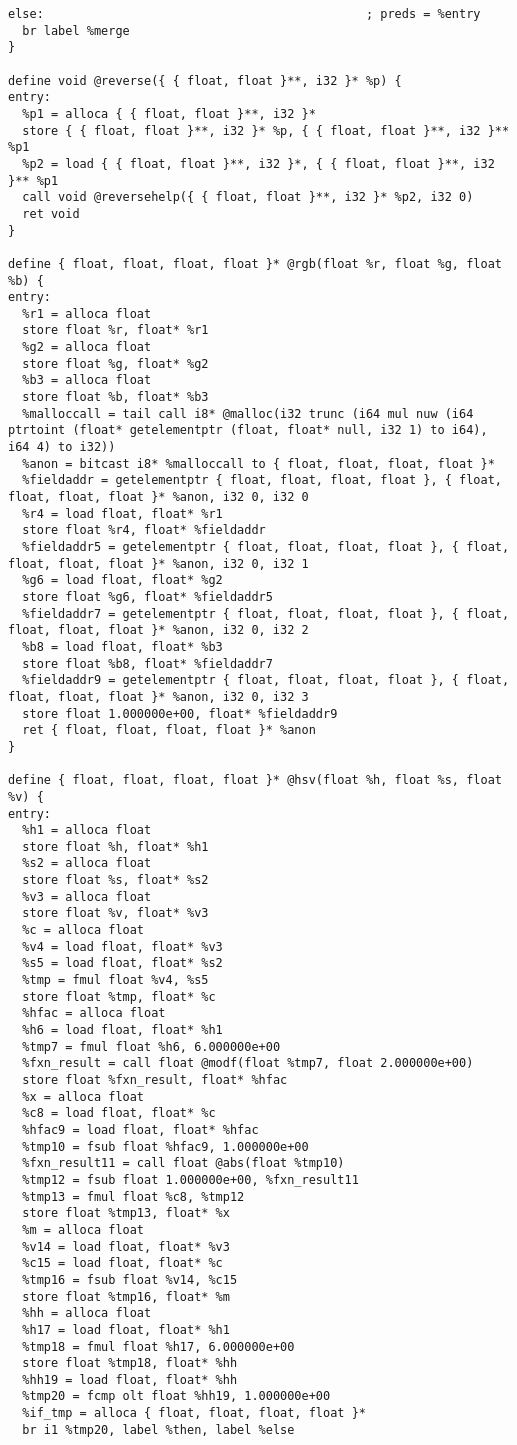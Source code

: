\documentclass[main.tex]{subfiles}
\begin{document}
{\begin{lstlisting}
else:                                             ; preds = %entry
  br label %merge
}

define void @reverse({ { float, float }**, i32 }* %p) {
entry:
  %p1 = alloca { { float, float }**, i32 }*
  store { { float, float }**, i32 }* %p, { { float, float }**, i32 }** %p1
  %p2 = load { { float, float }**, i32 }*, { { float, float }**, i32 }** %p1
  call void @reversehelp({ { float, float }**, i32 }* %p2, i32 0)
  ret void
}

define { float, float, float, float }* @rgb(float %r, float %g, float %b) {
entry:
  %r1 = alloca float
  store float %r, float* %r1
  %g2 = alloca float
  store float %g, float* %g2
  %b3 = alloca float
  store float %b, float* %b3
  %malloccall = tail call i8* @malloc(i32 trunc (i64 mul nuw (i64 ptrtoint (float* getelementptr (float, float* null, i32 1) to i64), i64 4) to i32))
  %anon = bitcast i8* %malloccall to { float, float, float, float }*
  %fieldaddr = getelementptr { float, float, float, float }, { float, float, float, float }* %anon, i32 0, i32 0
  %r4 = load float, float* %r1
  store float %r4, float* %fieldaddr
  %fieldaddr5 = getelementptr { float, float, float, float }, { float, float, float, float }* %anon, i32 0, i32 1
  %g6 = load float, float* %g2
  store float %g6, float* %fieldaddr5
  %fieldaddr7 = getelementptr { float, float, float, float }, { float, float, float, float }* %anon, i32 0, i32 2
  %b8 = load float, float* %b3
  store float %b8, float* %fieldaddr7
  %fieldaddr9 = getelementptr { float, float, float, float }, { float, float, float, float }* %anon, i32 0, i32 3
  store float 1.000000e+00, float* %fieldaddr9
  ret { float, float, float, float }* %anon
}

define { float, float, float, float }* @hsv(float %h, float %s, float %v) {
entry:
  %h1 = alloca float
  store float %h, float* %h1
  %s2 = alloca float
  store float %s, float* %s2
  %v3 = alloca float
  store float %v, float* %v3
  %c = alloca float
  %v4 = load float, float* %v3
  %s5 = load float, float* %s2
  %tmp = fmul float %v4, %s5
  store float %tmp, float* %c
  %hfac = alloca float
  %h6 = load float, float* %h1
  %tmp7 = fmul float %h6, 6.000000e+00
  %fxn_result = call float @modf(float %tmp7, float 2.000000e+00)
  store float %fxn_result, float* %hfac
  %x = alloca float
  %c8 = load float, float* %c
  %hfac9 = load float, float* %hfac
  %tmp10 = fsub float %hfac9, 1.000000e+00
  %fxn_result11 = call float @abs(float %tmp10)
  %tmp12 = fsub float 1.000000e+00, %fxn_result11
  %tmp13 = fmul float %c8, %tmp12
  store float %tmp13, float* %x
  %m = alloca float
  %v14 = load float, float* %v3
  %c15 = load float, float* %c
  %tmp16 = fsub float %v14, %c15
  store float %tmp16, float* %m
  %hh = alloca float
  %h17 = load float, float* %h1
  %tmp18 = fmul float %h17, 6.000000e+00
  store float %tmp18, float* %hh
  %hh19 = load float, float* %hh
  %tmp20 = fcmp olt float %hh19, 1.000000e+00
  %if_tmp = alloca { float, float, float, float }*
  br i1 %tmp20, label %then, label %else


\end{lstlisting}}
\end{document}
